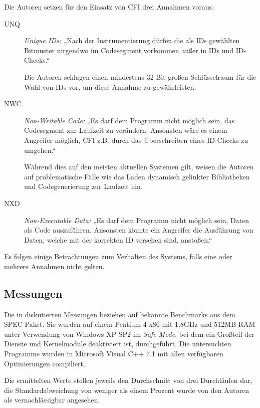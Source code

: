 \documentclass[11pt]{article}
\begin{document}
Die Autoren setzen für den Einsatz von CFI drei Annahmen voraus:

\begin{description}

  \item [UNQ] \emph{Unique IDs:} „Nach der Instrumentierung dürfen die als IDs
  gewählten Bitmuster nirgendwo im Codesegment vorkommen außer in IDs und
  ID-Checks.“

  Die Autoren schlagen einen mindestens 32 Bit großen Schlüsselraum für die
  Wahl von IDs vor, um diese Annahme zu gewährleisten.

  \item [NWC] \emph{Non-Writable Code:} „Es darf dem Programm nicht möglich
  sein, das Codesegment zur Laufzeit zu verändern. Ansonsten wäre es einem
  Angreifer möglich, CFI z.B. durch das Überschreiben eines ID-Checks zu
  umgehen.“

  Während dies auf den meisten aktuellen Systemen gilt, weisen die Autoren auf
  problematische Fälle wie das Laden dynamisch gelinkter Bibliotheken und
  Codegenerierung zur Laufzeit hin.

  \item [NXD] \emph{Non-Executable Data:} „Es darf dem Programm nicht möglich
  sein, Daten als Code auszuführen. Ansonsten könnte ein Angreifer die
  Ausführung von Daten, welche mit der korrekten ID versehen sind, anstoßen.“

\end{description}

Es folgen einige Betrachtungen zum Verhalten des Systems, falls eine oder
mehrere Annahmen nicht gelten.

\subsection{Messungen}

Die in \cite{abadi-2009-control-tissec} diskutierten Messungen beziehen auf
bekannte Benchmarks aus dem SPEC-Paket. Sie wurden auf einem Pentium 4 x86 mit
1.8GHz und 512MB RAM unter Verwendung von Windows XP SP2 im \emph{Safe Mode},
bei dem ein Großteil der Dienste und Kernelmodule deaktiviert ist,
durchgeführt. Die untersuchten Programme wurden in Microsoft Visual C++ 7.1 mit
allen verfügbaren Optimierungen compiliert.

Die ermittelten Werte stellen jeweils den Durchschnitt von drei Durchläufen
dar, die Standardabweichung von weniger als einem Prozent wurde von den Autoren
als vernachlässigbar angesehen.
\end{document}
